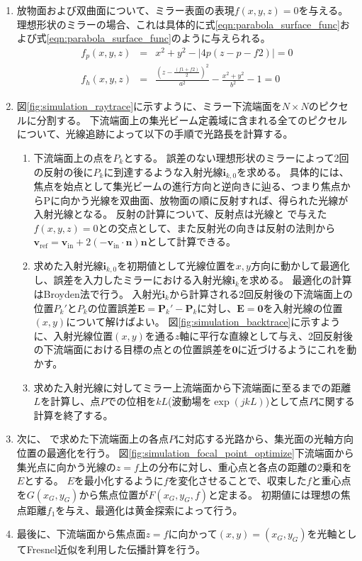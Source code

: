 \begin{enumerate}[\expandafter\maru 1]
  \item 放物面および双曲面について、ミラー表面の表現$f(x, y, z)=0$を与える。
    理想形状のミラーの場合、これは具体的に式\ref{eqn:parabola_surface_func}および式\ref{eqn:parabola_surface_func}のように与えられる。 \\
    \begin{eqnarray}
        f_p(x, y, z) &=& x^2 + y^2 - \left|4p(z-p-f2)\right| = 0 \label{eqn:parabola_surface_func} \\
        f_h(x, y, z) &=& \frac{\left(z - \frac{(f1 + f2)}{2}\right)^2}{a^2} - \frac{x^2 + y^2}{b^2} - 1 = 0 \label{eqn:hyperbola_surface_func}
    \end{eqnarray}
  \item 図\ref{fig:simulation_raytrace}に示すように、ミラー下流端面を$N \times N$のピクセルに分割する。
    下流端面上の集光ビーム定義域に含まれる全てのピクセルについて、光線追跡によって以下の手順で光路長を計算する。
    \begin{enumerate}[(1)]
      \item 下流端面上の点を$P_k$とする。
        誤差のない理想形状のミラーによって2回の反射の後に$P_k$に到達するような入射光線$\mathbf{i}_{k,0}$を求める。
        具体的には、焦点を始点として集光ビームの進行方向と逆向きに辿る、つまり焦点からPに向かう光線を双曲面、放物面の順に反射すれば、得られた光線が入射光線となる。
        反射の計算について、反射点は光線と\expandafter{} で与えた$f(x, y, z)=0$との交点として、また反射光の向きは反射の法則から$\mathbf{v}_{\text{ref}} = \mathbf{v}_{\text{in}} + 2 (-\mathbf{v}_{\text{in}} \cdot \mathbf{n}) \mathbf{n}$として計算できる。
      \item 求めた入射光線$\mathbf{i}_{k,0}$を初期値として光線位置を$x, y$方向に動かして最適化し、誤差を入力したミラーにおける入射光線$\mathbf{i}_k$を求める。
        最適化の計算はBroyden法で行う。
        入射光$\mathbf{i}_k$から計算される2回反射後の下流端面上の位置$P_k'$と$P_k$の位置誤差$\mathbf{E}=\mathbf{P}_k' - \mathbf{P}_k$に対し、$\mathbf{E}=\mathbf{0}$を入射光線の位置$(x, y)$について解けばよい。
        図\ref{fig:simulation_backtrace}に示すように、入射光線位置$(x, y)$を通る$z$軸に平行な直線として与え、2回反射後の下流端面における目標の点との位置誤差を$\mathbf{0}$に近づけるようにこれを動かす。
      \item 求めた入射光線に対してミラー上流端面から下流端面に至るまでの距離$L$を計算し、点$P$での位相を$k L$(波動場を$\exp(j k L)$)として点$P$に関する計算を終了する。
    \end{enumerate}
  \item 次に、\expandafter{} で求めた下流端面上の各点$P$に対応する光路から、集光面の光軸方向位置の最適化を行う。
    図\ref{fig:simulation_focal_point_optimize}下流端面から集光点に向かう光線の$z=f$上の分布に対し、重心点と各点の距離の2乗和を$E$とする。
    $E$を最小化するように$f$を変化させることで、収束した$f$と重心点を$G(x_G, y_G)$から焦点位置が$F(x_G, y_G, f)$と定まる。
    初期値には理想の焦点距離$f_1$を与え、最適化は黄金探索によって行う。
  \item 最後に、下流端面から焦点面$z=f$に向かって$(x, y)=(x_G, y_G)$を光軸としてFresnel近似を利用した伝播計算を行う。
\end{enumerate}


